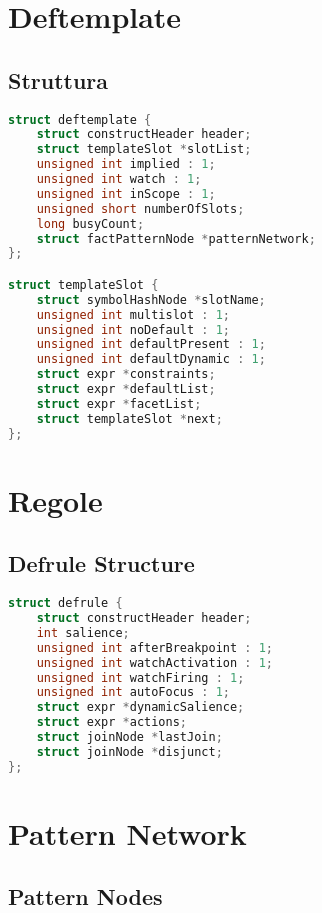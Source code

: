 \section{Deftemplate}

\subsection{Struttura}

\begin{lstlisting}[language=C]
struct deftemplate {
    struct constructHeader header;
    struct templateSlot *slotList;
    unsigned int implied : 1;
    unsigned int watch : 1;
    unsigned int inScope : 1;
    unsigned short numberOfSlots;
    long busyCount;
    struct factPatternNode *patternNetwork;
};

struct templateSlot {
    struct symbolHashNode *slotName;
    unsigned int multislot : 1;
    unsigned int noDefault : 1;
    unsigned int defaultPresent : 1;
    unsigned int defaultDynamic : 1;
    struct expr *constraints;
    struct expr *defaultList;
    struct expr *facetList;
    struct templateSlot *next;
};
\end{lstlisting}

\section{Regole}

\subsection{Defrule Structure}

\begin{lstlisting}[language=C]
struct defrule {
    struct constructHeader header;
    int salience;
    unsigned int afterBreakpoint : 1;
    unsigned int watchActivation : 1;
    unsigned int watchFiring : 1;
    unsigned int autoFocus : 1;
    struct expr *dynamicSalience;
    struct expr *actions;
    struct joinNode *lastJoin;
    struct joinNode *disjunct;
};
\end{lstlisting}

\section{Pattern Network}

\subsection{Pattern Nodes}

